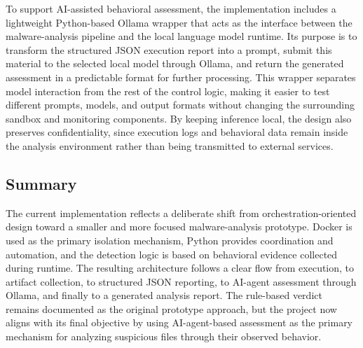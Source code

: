 To support AI-assisted behavioral assessment, the implementation includes a lightweight Python-based Ollama wrapper that acts as the interface between the malware-analysis pipeline and the local language model runtime. Its purpose is to transform the structured JSON execution report into a prompt, submit this material to the selected local model through Ollama, and return the generated assessment in a predictable format for further processing. This wrapper separates model interaction from the rest of the control logic, making it easier to test different prompts, models, and output formats without changing the surrounding sandbox and monitoring components. By keeping inference local, the design also preserves confidentiality, since execution logs and behavioral data remain inside the analysis environment rather than being transmitted to external services.




\subsection{Summary}
\noindent
The current implementation reflects a deliberate shift from orchestration-oriented design toward a smaller and more focused malware-analysis prototype. Docker is used as the primary isolation mechanism, Python provides coordination and automation, and the detection logic is based on behavioral evidence collected during runtime. The resulting architecture follows a clear flow from execution, to artifact collection, to structured JSON reporting, to AI-agent assessment through Ollama, and finally to a generated analysis report. The rule-based verdict remains documented as the original prototype approach, but the project now aligns with its final objective by using AI-agent-based assessment as the primary mechanism for analyzing suspicious files through their observed behavior.
